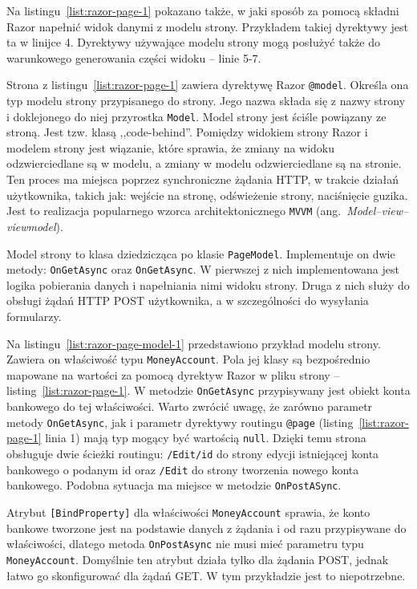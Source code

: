 Na listingu~\ref{list:razor-page-1} pokazano także, w jaki sposób za pomocą składni Razor napełnić widok danymi z modelu strony. Przykładem takiej dyrektywy jest ta w linijce 4. Dyrektywy używające modelu strony mogą posłużyć także do warunkowego generowania części widoku -- linie 5-7.

Strona z listingu~\ref{list:razor-page-1} zawiera dyrektywę Razor \texttt{@model}. Określa ona typ modelu strony przypisanego do strony. Jego nazwa składa się z nazwy strony i doklejonego do niej przyrostka \texttt{Model}. Model strony jest ściśle powiązany ze stroną. Jest tzw. klasą ,,code-behind''. Pomiędzy widokiem strony Razor i modelem strony jest wiązanie, które sprawia, że zmiany na widoku odzwierciedlane są w modelu, a zmiany w modelu odzwierciedlane są na stronie. Ten proces ma miejsca poprzez synchroniczne żądania HTTP, w trakcie działań użytkownika, takich jak: wejście na stronę, odświeżenie strony, naciśnięcie guzika. Jest to realizacja popularnego wzorca architektonicznego \texttt{MVVM} (ang.~\emph{Model–view–viewmodel}).

Model strony to klasa dziedzicząca po klasie \texttt{PageModel}. Implementuje on dwie metody: \texttt{OnGetAsync} oraz \texttt{OnGetAsync}. W pierwszej z nich implementowana jest logika pobierania danych i napełniania nimi widoku strony. Druga z nich służy do obsługi żądań HTTP POST użytkownika, a w szczególności do wysyłania formularzy. 

Na listingu~\ref{list:razor-page-model-1} przedstawiono przykład modelu strony. Zawiera on właściwość typu \texttt{MoneyAccount}. Pola jej klasy są bezpośrednio mapowane na wartości za pomocą dyrektyw Razor w pliku strony -- listing~\ref{list:razor-page-1}. W metodzie \texttt{OnGetAsync} przypisywany jest obiekt konta bankowego do tej właściwości. Warto zwrócić uwagę, że zarówno parametr metody \texttt{OnGetAsync}, jak i parametr dyrektywy routingu \texttt{@page} (listing~\ref{list:razor-page-1} linia 1) mają typ mogący być wartością \texttt{null}. Dzięki temu strona obsługuje dwie ścieżki routingu: \texttt{/Edit/{id}} do strony edycji istniejącej konta bankowego o podanym id oraz \texttt{/Edit} do strony tworzenia nowego konta bankowego. Podobna sytuacja ma miejsce w metodzie \texttt{OnPostASync}.

Atrybut \texttt{[BindProperty]} dla właściwości \texttt{MoneyAccount} sprawia, że konto bankowe tworzone jest na podstawie danych z żądania i od razu przypisywane do właściwości, dlatego metoda \texttt{OnPostAsync} nie musi mieć parametru typu \texttt{MoneyAccount}. Domyślnie ten atrybut działa tylko dla żądania POST, jednak łatwo go skonfigurować dla żądań GET. W tym przykładzie jest to niepotrzebne.

